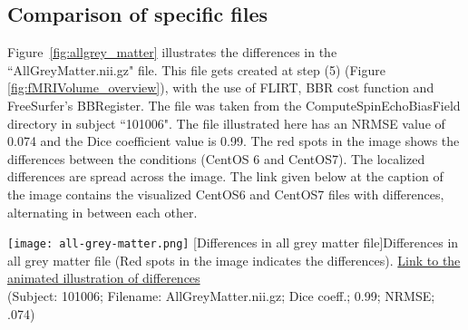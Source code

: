 \subsection{Comparison of specific files}
Figure~\ref{fig:allgrey_matter} illustrates the differences in the ``AllGreyMatter.nii.gz" file. This file gets created at step (5) (Figure \ref{fig:fMRIVolume_overview}), with the use of FLIRT, BBR cost function and FreeSurfer's BBRegister. The file was taken from the ComputeSpinEchoBiasField directory in subject ``101006". The file illustrated here has an NRMSE value of 0.074 and the Dice coefficient value is 0.99. The red spots in the image shows the differences between the conditions (CentOS 6 and CentOS7). The localized differences are spread across the image. The link given below at the caption of the image contains the visualized CentOS6 and CentOS7 files with differences, alternating in between each other.

\begin{center}
\texttt{[image: all-grey-matter.png]}
[Differences in all grey matter file]{Differences in all grey matter file (Red spots in the image indicates the differences). \href{https://drive.google.com/file/d/1dzpyMalJ6_ox8jLedKvhKrP2ew7C7N-r/view?usp=sharing}{Link to the animated illustration of differences}\\{(Subject: 101006; Filename: AllGreyMatter.nii.gz; Dice coeff.; 0.99; NRMSE; .074)}}
\label{fig:allgrey_matter}
\end{center}



